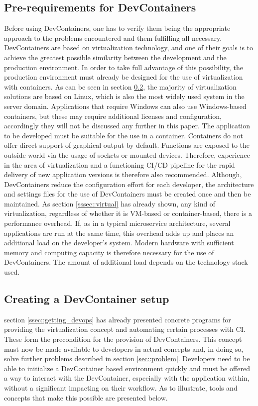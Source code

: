     \subsection{Pre-requirements for DevContainers}
    Before using DevContainers, one has to verify them being the appropriate approach to the problems encountered and them fulfilling all necessary.\newline
    DevContainers are based on virtualization technology, and one of their goals is to achieve the greatest possible similarity between the development and the production environment. In order to take full advantage of this possibility, the production environment must already be designed for the use of virtualization with containers. As can be seen in section \ref{ssec::toolsused}, the majority of virtualization solutions are based on Linux, which is also the most widely used system in the server domain. Applications that require Windows can also use Windows-based containers, but these may require additional licenses and configuration, accordingly they will not be discussed any further in this paper. The application to be developed must be suitable for the use in a container. Containers do not offer direct support of graphical output by default. Functions are exposed to the outside world via the usage of sockets or mounted devices. Therefore, experience in the area of virtualization and a functioning \ac{CI}/\ac{CD} pipeline for the rapid delivery of new application versions is therefore also recommended.\newline
    Although, DevContainers reduce the configuration effort for each developer, the architecture and settings files for the use of DevContainers must be created once and then be maintained. As section \ref{sssec::virtual} has already shown,  any kind of virtualization, regardless of whether it is VM-based or container-based, there is a performance overhead. If, as in a typical microservice architecture, several applications are run at the same time, this overhead adds up and places an additional load on the developer's system. Modern hardware with sufficient memory and computing capacity is therefore necessary for the use of DevContainers. The amount of additional load depends on the technology stack used.

    \subsection{Creating a DevContainer setup}\label{ssec::toolsused}
    section \ref{ssec::getting_devops} has already presented concrete programs for providing the virtualization concept and automating certain processes with \ac{CI}. These form the precondition  for the provision of DevContainers. This concept must now be made available to developers in actual concepts and, in doing so, solve further problems described in section \ref{sec::problem}. Developers need to be able to initialize a DevContainer based environment quickly and must be offered a way to interact with the DevContainer, especially with the application within, without a significant impacting on their workflow. As to illustrate, tools and concepts that make this possible are presented below.

